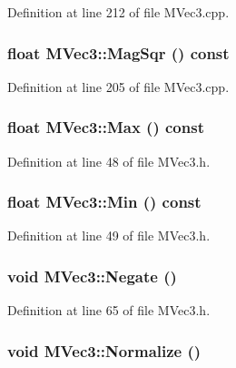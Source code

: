Definition at line 212 of file MVec3.cpp.\hypertarget{class_m_vec3_6deaf4608ece1b212f214a1d8d304cc7}{
\subsubsection[{MagSqr}]{\setlength{\rightskip}{0pt plus 5cm}float MVec3::MagSqr () const}}
\label{class_m_vec3_6deaf4608ece1b212f214a1d8d304cc7}




Definition at line 205 of file MVec3.cpp.\hypertarget{class_m_vec3_c34a45816652b6f59fe6300cdc336a58}{
\subsubsection[{Max}]{\setlength{\rightskip}{0pt plus 5cm}float MVec3::Max () const}}
\label{class_m_vec3_c34a45816652b6f59fe6300cdc336a58}




Definition at line 48 of file MVec3.h.\hypertarget{class_m_vec3_85c543975270d4dc429b62edec1a853d}{
\subsubsection[{Min}]{\setlength{\rightskip}{0pt plus 5cm}float MVec3::Min () const}}
\label{class_m_vec3_85c543975270d4dc429b62edec1a853d}




Definition at line 49 of file MVec3.h.\hypertarget{class_m_vec3_a99b7529b11e93834480d70092542e24}{
\subsubsection[{Negate}]{\setlength{\rightskip}{0pt plus 5cm}void MVec3::Negate ()}}
\label{class_m_vec3_a99b7529b11e93834480d70092542e24}




Definition at line 65 of file MVec3.h.\hypertarget{class_m_vec3_89f60c8001f1e04e5d17327e3b9ada63}{
\subsubsection[{Normalize}]{\setlength{\rightskip}{0pt plus 5cm}void MVec3::Normalize ()}}
\label{class_m_vec3_89f60c8001f1e04e5d17327e3b9ada63}




